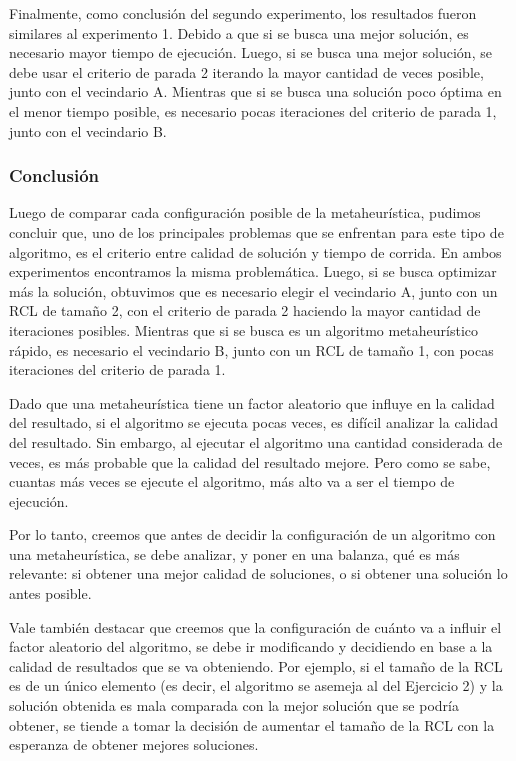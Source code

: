 \par Finalmente, como conclusión del segundo experimento, los resultados fueron similares al experimento 1. Debido a que si se busca una mejor solución, es necesario mayor tiempo de ejecución. Luego, si se busca una mejor solución, se debe usar el criterio de parada 2 iterando la mayor cantidad de veces posible, junto con el vecindario A. Mientras que si se busca una solución poco óptima en el menor tiempo posible, es necesario pocas iteraciones del criterio de parada 1, junto con el vecindario B. 


\subsubsection{Conclusión}

Luego de comparar cada configuración posible de la metaheurística, pudimos concluir que, uno de los principales problemas que se enfrentan para este tipo de algoritmo, es el criterio entre calidad de solución y tiempo de corrida. En ambos experimentos encontramos la misma problemática. Luego, si se busca optimizar más la solución, obtuvimos que es necesario elegir el vecindario A, junto con un RCL de tamaño 2, con el criterio de parada 2 haciendo la mayor cantidad de iteraciones posibles. Mientras que si se busca es un algoritmo metaheurístico rápido, es necesario el vecindario B, junto con un RCL de tamaño 1, con pocas iteraciones del criterio de parada 1.
\par Dado que una metaheurística tiene un factor aleatorio que influye en la calidad del resultado, si el algoritmo se ejecuta pocas veces, es difícil analizar la calidad del resultado. Sin embargo, al ejecutar el algoritmo una cantidad considerada de veces, es más probable que la calidad del resultado mejore. Pero como se sabe, cuantas más veces se ejecute el algoritmo, más alto va a ser el tiempo de ejecución.
\par Por lo tanto, creemos que antes de decidir la configuración de un algoritmo con una metaheurística, se debe analizar, y poner en una balanza, qué es más relevante: si obtener una mejor calidad de soluciones, o si obtener una solución lo antes posible.
\par Vale también destacar que creemos que la configuración de cuánto va a influir el factor aleatorio del algoritmo, se debe ir modificando y decidiendo en base a la calidad de resultados que se va obteniendo. Por ejemplo, si el tamaño de la RCL es de un único elemento (es decir, el algoritmo se asemeja al del Ejercicio 2) y la solución obtenida es mala comparada con la mejor solución que se podría obtener, se tiende a tomar la decisión de aumentar el tamaño de la RCL con la esperanza de obtener mejores soluciones.
